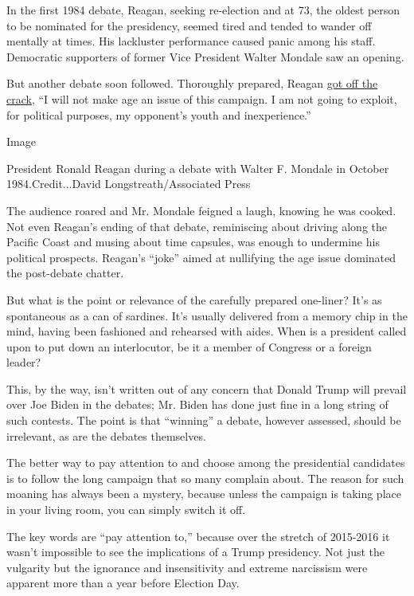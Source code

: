 In the first 1984 debate, Reagan, seeking re-election and at 73, the
oldest person to be nominated for the presidency, seemed tired and
tended to wander off mentally at times. His lackluster performance
caused panic among his staff. Democratic supporters of former Vice
President Walter Mondale saw an opening.

But another debate soon followed. Thoroughly prepared, Reagan
\href{http://content.time.com/time/specials/packages/article/0,28804,1844704_1844706_1844612,00.html}{got
off the crack}, ``I will not make age an issue of this campaign. I am
not going to exploit, for political purposes, my opponent's youth and
inexperience.''

Image

President Ronald Reagan during a debate with Walter F. Mondale in
October 1984.Credit...David Longstreath/Associated Press

The audience roared and Mr. Mondale feigned a laugh, knowing he was
cooked. Not even Reagan's ending of that debate, reminiscing about
driving along the Pacific Coast and musing about time capsules, was
enough to undermine his political prospects. Reagan's ``joke'' aimed at
nullifying the age issue dominated the post-debate chatter.

But what is the point or relevance of the carefully prepared one-liner?
It's as spontaneous as a can of sardines. It's usually delivered from a
memory chip in the mind, having been fashioned and rehearsed with aides.
When is a president called upon to put down an interlocutor, be it a
member of Congress or a foreign leader?

This, by the way, isn't written out of any concern that Donald Trump
will prevail over Joe Biden in the debates; Mr. Biden has done just fine
in a long string of such contests. The point is that ``winning'' a
debate, however assessed, should be irrelevant, as are the debates
themselves.

The better way to pay attention to and choose among the presidential
candidates is to follow the long campaign that so many complain about.
The reason for such moaning has always been a mystery, because unless
the campaign is taking place in your living room, you can simply switch
it off.

The key words are ``pay attention to,'' because over the stretch of
2015-2016 it wasn't impossible to see the implications of a Trump
presidency. Not just the vulgarity but the ignorance and insensitivity
and extreme narcissism were apparent more than a year before Election
Day.

